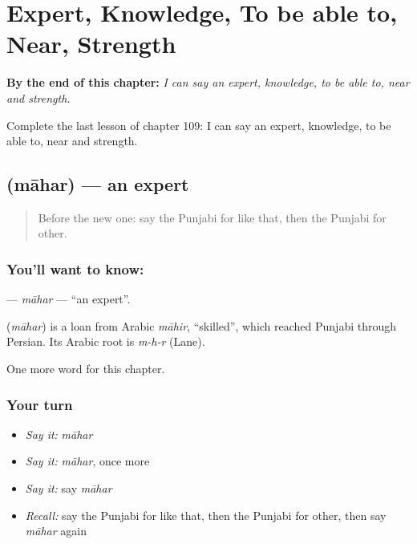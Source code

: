 
\chapter{Expert, Knowledge, To be able to, Near, Strength}
\label{ch:pa-expert-knowledge-to-be-able-to-near-strength}

\begin{chapteropening}
\textbf{By the end of this chapter:} \emph{I can say an expert, knowledge, to be able to, near and strength.}

Complete the last lesson of chapter 109: I can say an expert, knowledge, to be able to, near and strength.
\end{chapteropening}

\section[\texorpdfstring{\pa{ਮਾਹਰ} (māhar)}{ਮਾਹਰ (māhar)}]{ (māhar) — an expert}

\label{lesson:PA-C109-mahar}



\begin{quote}
Before the new one: say the Punjabi for like that, then the Punjabi for other.
\end{quote}

\subsection*{You'll want to know: }
\textbf{} — \emph{māhar} — \textquotedblleft{}an expert\textquotedblright{}.

\begin{cousinweb}
\textbf{} (\emph{māhar}) is a loan from Arabic \emph{māhir}, \textquotedblleft{}skilled\textquotedblright{}, which reached Punjabi through Persian. Its Arabic root is \emph{m-h-r} (Lane).
\end{cousinweb}

\begin{grammarlens}[title={What you've built}]
One more word for this chapter.
\end{grammarlens}

\subsection*{Your turn}
\begin{itemize}
\raggedright
  \item \emph{Say it:} \emph{māhar}
  \item \emph{Say it:} \emph{māhar}, once more
  \item \emph{Say it:} say \emph{māhar}
  \item \emph{Recall:} say the Punjabi for like that, then the Punjabi for other, then say \emph{māhar} again
\end{itemize}

